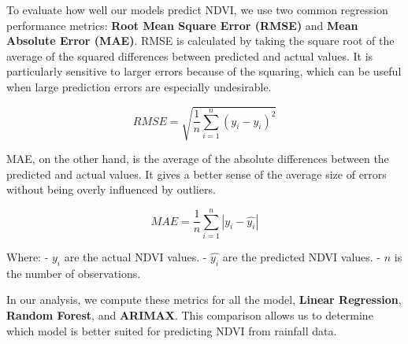 \documentclass[
]{article}
\begin{document}
To evaluate how well our models predict NDVI, we use two common
regression performance metrics: \textbf{Root Mean Square Error (RMSE)}
and \textbf{Mean Absolute Error (MAE)}. RMSE is calculated by taking the
square root of the average of the squared differences between predicted
and actual values. It is particularly sensitive to larger errors because
of the squaring, which can be useful when large prediction errors are
especially undesirable.

\[
RMSE = \sqrt{\frac{1}{n} \sum_{i=1}^{n} (y_i - \hat{y_i})^2}
\]

MAE, on the other hand, is the average of the absolute differences
between the predicted and actual values. It gives a better sense of the
average size of errors without being overly influenced by outliers.

\[
MAE = \frac{1}{n} \sum_{i=1}^{n} |y_i - \hat{y_i}|
\]

Where: - \(y_i\) are the actual NDVI values. - \(\hat{y_i}\) are the
predicted NDVI values. - \(n\) is the number of observations.

In our analysis, we compute these metrics for all the model,
\textbf{Linear Regression}, \textbf{Random Forest}, and \textbf{ARIMAX}.
This comparison allows us to determine which model is better suited for
predicting NDVI from rainfall data.
\end{document}
